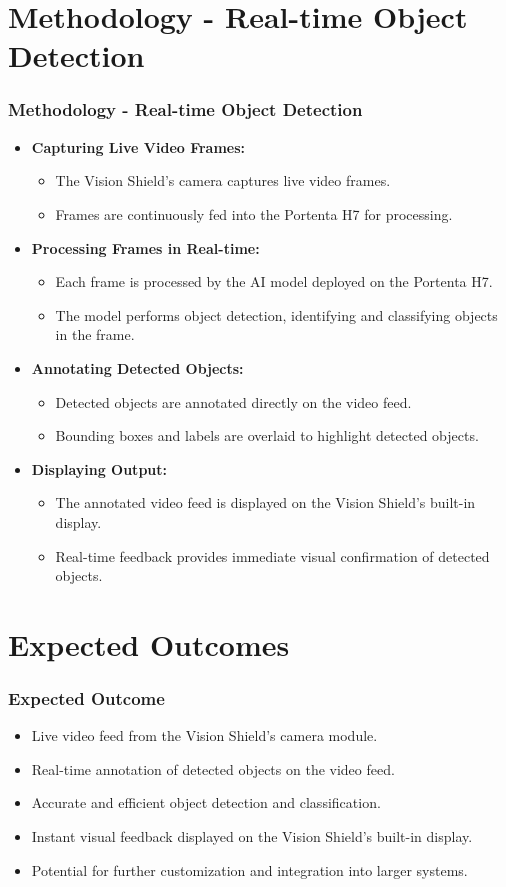 \documentclass[10pt, a4paper]{beamer}
\begin{document}
	
	\section{Methodology - Real-time Object Detection}
	\begin{frame}
		\frametitle{Methodology - Real-time Object Detection}
		\begin{itemize}
			\item \textbf{Capturing Live Video Frames:}
			\begin{itemize}
				\item The Vision Shield's camera captures live video frames.
				\item Frames are continuously fed into the Portenta H7 for processing.
			\end{itemize}
			\item \textbf{Processing Frames in Real-time:}
			\begin{itemize}
				\item Each frame is processed by the AI model deployed on the Portenta H7.
				\item The model performs object detection, identifying and classifying objects in the frame.
			\end{itemize}
			\item \textbf{Annotating Detected Objects:}
			\begin{itemize}
				\item Detected objects are annotated directly on the video feed.
				\item Bounding boxes and labels are overlaid to highlight detected objects.
			\end{itemize}
			\item \textbf{Displaying Output:}
			\begin{itemize}
				\item The annotated video feed is displayed on the Vision Shield's built-in display.
				\item Real-time feedback provides immediate visual confirmation of detected objects.
			\end{itemize}
		\end{itemize}
	\end{frame}
	
	\section{Expected Outcomes}
	\begin{frame}
		\frametitle{Expected Outcome}
		\begin{itemize}
			\item Live video feed from the Vision Shield's camera module.
			\item Real-time annotation of detected objects on the video feed.
			\item Accurate and efficient object detection and classification.
			\item Instant visual feedback displayed on the Vision Shield's built-in display.
			\item Potential for further customization and integration into larger systems.
		\end{itemize}
	\end{frame}
	
\end{document}
